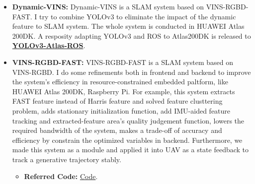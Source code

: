 \documentclass[11pt,a4paper,sans]{moderncv}        %
\begin{document}
{\begin{itemize}
\textbf{Jianheng Liu}, XuanFu Li, Yueqian Liu and Haoyao Chen

RA-L and IROS, 2022

We develops a novel real-time system for estimating the payload position; the system consists of a monocular fisheye camera and a novel encoder-based device. A Gaussian fusion-based estimation algorithm is developed to obtain the payload state estimation. Based on the robust payload position estimation, a payload controller is presented to ensure the reliable tracking performance on aggressive trajectories. Several experiments are performed to validate the high performance of the proposed method. 

\begin{itemize}
\item \textbf{Referred Code:} \href{https://github.com/HITSZ-NRSL/Dynamic-VINS}{Code}
\item \textbf{Referred Video:} \href{https://www.bilibili.com/video/BV1bF411t7mx?share_source=copy_web}{Video}
\end{itemize}
\vspace{6pt}

\item \textbf{Dynamic-VINS:} Dynamic-VINS is a SLAM system based on VINS-RGBD-FAST. I try to combine YOLOv3 to eliminate the impact of the dynamic feature to SLAM system. The whole system is conducted in HUAWEI Atlas 200DK. A resposity adapting YOLOv3 and ROS to Atlas200DK is released to \href{https://github.com/jianhengLiu/YOLOv3-Atlas-ROS}{\textbf{YOLOv3-Atlas-ROS}}.

\vspace{6pt}

\item \textbf{VINS-RGBD-FAST:} VINS-RGBD-FAST is a SLAM system based on VINS-RGBD. I do some refinements both in frontend and backend to improve the system's efficiency in resource-constrained embedded paltform, like HUAWEI Atlas 200DK, Raspberry Pi. For example, this system extracts FAST feature instead of Harris feature and solved feature clusttering problem, adds stationary initialization function, add IMU-aided feature tracking and extracted-feature area's quality judgement function, lowers the required bandwidth of the system, makes a trade-off of accuracy and efficiency by constrain the optimized variables in backend. Furthermore, we made this system as a module and applied it into UAV as a state feedback to track a generative trajectory stably. 

\begin{itemize}
\item \textbf{Referred Code:} \href{https://github.com/jianhengLiu/VINS-RGBD-FAST}{Code}.
\end{itemize}
\vspace{6pt}
\vspace{6pt}


\end{itemize}}
\end{document}
